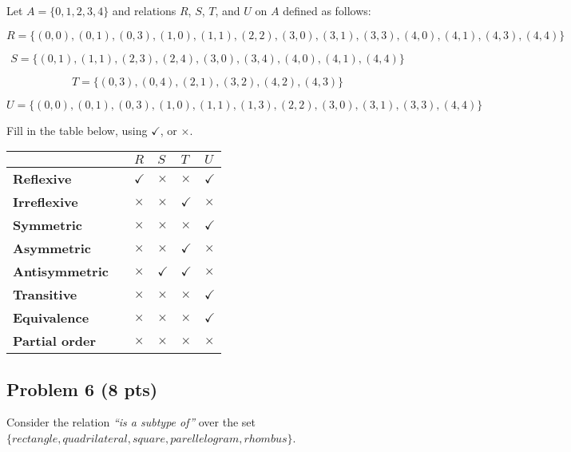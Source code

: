 \documentclass[12pt]{article}
\begin{document}
\noindent Let $A = \{ 0, 1, 2, 3, 4 \}$ and relations $R$, $S$, $T$, and $U$ on $A$ defined as follows:

\[ R = \{ (0, 0),  (0, 1),  (0, 3),  (1, 0),  (1, 1),  (2, 2),  (3, 0),  (3, 1), (3, 3), (4, 0), (4, 1), (4, 3), (4, 4)  \}\]

\[ S = \{ (0, 1),  (1, 1),  (2, 3),  (2, 4), (3, 0), (3, 4), (4, 0), (4, 1), (4, 4)  \}\]

\[ T = \{ (0, 3), (0, 4),  (2, 1), (3, 2), (4, 2), (4, 3) \}\]

\[ U = \{ (0, 0),  (0, 1), (0, 3), (1, 0), (1, 1), (1, 3), (2, 2), (3, 0), (3, 1), (3, 3), (4, 4) \}\]

\noindent Fill in the table below, using $\checkmark$, or $\times$.

\begin{center}
\begin{tabular}{|l|l|l|l|l|l|}
\hline
						&	&	$R$	&	$S$	&	$T$	& $U$\\
\hline
\textbf{Reflexive} 	&	&	$\checkmark$ &	$\times$		&	$\times$ & $\checkmark$\\
\hline
\textbf{Irreflexive} 	&	&	$\times$ &	$\times$		&	$\checkmark$ &	$\times$	\\
\hline
\textbf{Symmetric} 	&	&	$\times$ &	$\times$ 	&	$\times$ &	$\checkmark$\\
\hline
\textbf{Asymmetric} 	&	&	$\times$ &	$\times$ 	&	$\checkmark$ &	$\times$\\
\hline
\textbf{Antisymmetric} &	&	$\times$ &	$\checkmark$	&	$\checkmark$ &	$\times$ \\
\hline
\textbf{Transitive} 	&	&	$\times$ &	$\times$ &	$\times$	&	$\checkmark$\\
\hline
\textbf{Equivalence} 	&	&	$\times$ &	$\times$ &	$\times$	&	$\checkmark$\\
\hline
\textbf{Partial order} 	&	&	$\times$ &	$\times$	&	$\times$	&	$\times$\\
\hline
\end{tabular}
\end{center}

\newpage

\subsection{Problem 6 (8 pts)}

\noindent Consider the relation \textit{``is a subtype of''} over the set \\
\indent \indent \indent $\{ rectangle, quadrilateral, square, parellelogram, rhombus\}$.
\end{document}
